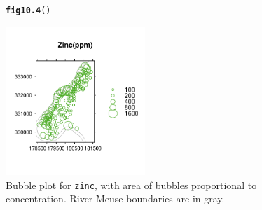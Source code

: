 \documentclass[12pt, a4paper,  BCOR=8.25mm, DIV=15]{scrartcl}\usepackage[]{graphicx}\usepackage[]{color}
\makeatletter
\newcommand{\hlstd}[1]{\textcolor[rgb]{0.345,0.345,0.345}{#1}}%
\newcommand{\hlkwd}[1]{\textcolor[rgb]{0.737,0.353,0.396}{\textbf{#1}}}%
\newenvironment{kframe}{%
 \def\at@end@of@kframe{}%
 \ifinner\ifhmode%
  \def\at@end@of@kframe{\end{minipage}}%
  \begin{minipage}{\columnwidth}%
 \fi\fi%
 \def\FrameCommand##1{\hskip\@totalleftmargin \hskip-\fboxsep
 \colorbox{shadecolor}{##1}\hskip-\fboxsep
     \hskip-\linewidth \hskip-\@totalleftmargin \hskip\columnwidth}%
 \MakeFramed {\advance\hsize-\width
   \@totalleftmargin\z@ \linewidth\hsize
   \@setminipage}}%
 {\par\unskip\endMakeFramed%
 \at@end@of@kframe}
\newenvironment{knitrout}{}{} %
\newcommand{\txtt}[1]{{\texttt{#1}}}
\makeatother
\begin{document}
\begin{figure}
\begin{knitrout}
\color{fgcolor}\begin{kframe}
\begin{alltt}
\hlkwd{fig10.4}\hlstd{()}
\end{alltt}
\end{kframe}

{\centering \includegraphics[width=0.47\textwidth]{figs/map-meuse-bubble-10_4-1} 

}



\end{knitrout}
 \caption{Bubble plot for \txtt{zinc},
with area of bubbles proportional to concentration.
River Meuse boundaries are in gray.\label{fig:ZnRiv}}
\end{figure}
\end{document}
